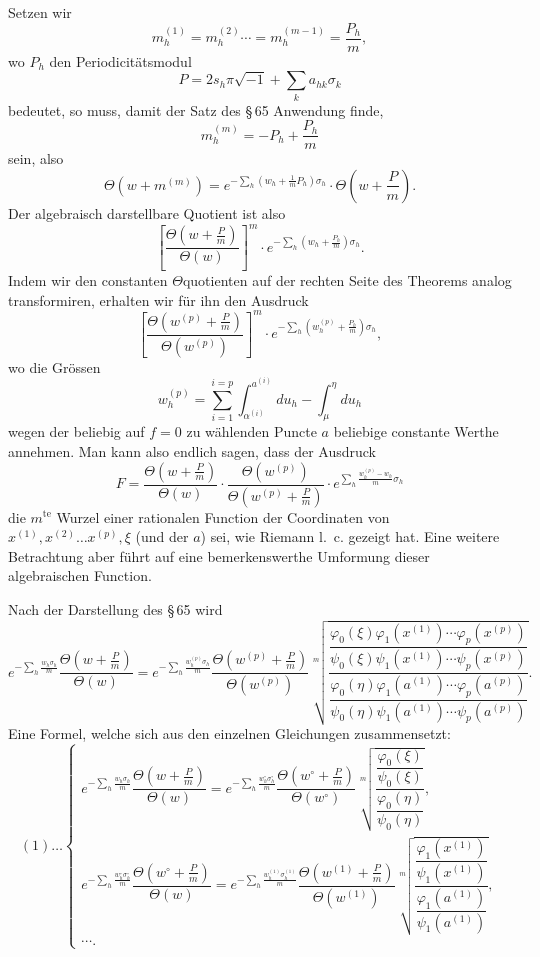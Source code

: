 \documentclass[10pt]{article}
\begin{document}
Setzen wir
\[
m_h^{(1)}=m_h^{(2)}\cdots=m_h^{(m-1)}=\frac{P_h}{m},
\]
wo \(P_h\) den Periodicitätsmodul
\[
P=2s_h\pi\sqrt{-1}+\sum_k a_{hk}\sigma_k
\]
bedeutet, so muss, damit der Satz des \S\,65 Anwendung finde,
\[
m_h^{(m)}=-P_h+\frac{P_h}{m}
\]
sein, also
\[
\Theta(w+m^{(m)})=
e^{-\sum_h\left(w_h+\frac1mP_h\right)\sigma_h}
\cdot\Theta\left(w+\frac Pm\right).
\]
Der algebraisch darstellbare Quotient ist also
\[
\left[\frac{\Theta\left(w+\frac Pm\right)}{\Theta(w)}\right]^m
\cdot
e^{-\sum_h\left(w_h+\frac{P_h}{m}\right)\sigma_h}.
\]
Indem wir den constanten \(\Theta\)quotienten auf der rechten Seite des Theorems analog transformiren, erhalten wir für ihn den Ausdruck
\[
\left[\frac{\Theta\left(w^{(p)}+\frac Pm\right)}{\Theta(w^{(p)})}\right]^m
\cdot
e^{-\sum_h\left(w_h^{(p)}+\frac{P_h}{m}\right)\sigma_h},
\]
wo die Grössen
\[
w_h^{(p)}=\sum_{i=1}^{i=p}\int_{\alpha^{(i)}}^{a^{(i)}}du_h-\int_{\mu}^{\eta}du_h
\]
wegen der beliebig auf \(f=0\) zu wählenden Puncte \(a\) beliebige constante Werthe annehmen. Man kann also endlich sagen, dass der Ausdruck
\[
F=
\frac{\Theta\left(w+\frac Pm\right)}{\Theta(w)}
\cdot
\frac{\Theta(w^{(p)})}{\Theta\left(w^{(p)}+\frac Pm\right)}
\cdot
e^{\sum_h\frac{w_h^{(p)}-w_h}{m}\sigma_h}
\]
die \(m^{\text{te}}\) Wurzel einer rationalen Function der Coordinaten von \(x^{(1)},x^{(2)}\ldots x^{(p)},\xi\) (und der \(a\)) sei, wie Riemann l.~c. gezeigt hat. Eine weitere Betrachtung aber führt auf eine bemerkenswerthe Umformung dieser algebraischen Function.

Nach der Darstellung des \S\,65 wird
\[
e^{-\sum_h\frac{w_h\sigma_h}{m}}
\frac{\Theta\left(w+\frac Pm\right)}{\Theta(w)}
=
e^{-\sum_h\frac{w_h^{(p)}\sigma_h}{m}}
\frac{\Theta\left(w^{(p)}+\frac Pm\right)}{\Theta(w^{(p)})}
\sqrt[m]{
\frac{
\dfrac{\varphi_0(\xi)\varphi_1(x^{(1)})\cdots\varphi_p(x^{(p)})}
      {\psi_0(\xi)\psi_1(x^{(1)})\cdots\psi_p(x^{(p)})}
}{
\dfrac{\varphi_0(\eta)\varphi_1(a^{(1)})\cdots\varphi_p(a^{(p)})}
      {\psi_0(\eta)\psi_1(a^{(1)})\cdots\psi_p(a^{(p)})}
}
}.
\]
Eine Formel, welche sich aus den einzelnen Gleichungen zusammensetzt:
\[
(1)\ldots
\begin{cases}
e^{-\sum_h\frac{w_h\sigma_h}{m}}
\dfrac{\Theta\left(w+\frac Pm\right)}{\Theta(w)}
=
e^{-\sum_h\frac{w_h^\circ\sigma_h^\circ}{m}}
\dfrac{\Theta\left(w^\circ+\frac Pm\right)}{\Theta(w^\circ)}
\sqrt[m]{\dfrac{\dfrac{\varphi_0(\xi)}{\psi_0(\xi)}}{\dfrac{\varphi_0(\eta)}{\psi_0(\eta)}}},\\[1.0em]
e^{-\sum_h\frac{w_h^\circ\sigma_h^\circ}{m}}
\dfrac{\Theta\left(w^\circ+\frac Pm\right)}{\Theta(w)}
=
e^{-\sum_h\frac{w_h^{(1)}\sigma_h^{(1)}}{m}}
\dfrac{\Theta\left(w^{(1)}+\frac Pm\right)}{\Theta(w^{(1)})}
\sqrt[m]{\dfrac{\dfrac{\varphi_1(x^{(1)})}{\psi_1(x^{(1)})}}{\dfrac{\varphi_1(a^{(1)})}{\psi_1(a^{(1)})}}},\\
\cdots.
\end{cases}
\]
\end{document}
